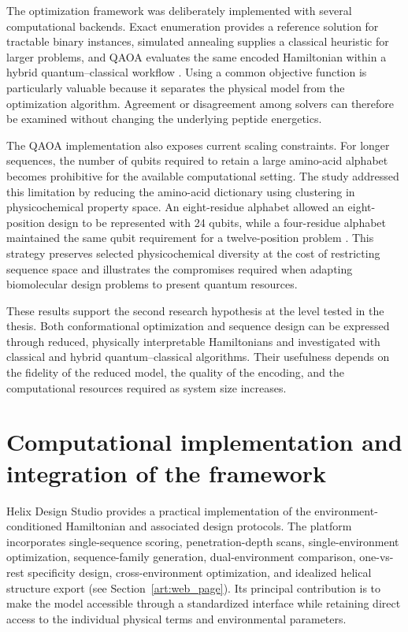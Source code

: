 The optimization framework was deliberately implemented with several computational backends. Exact enumeration provides a reference solution for tractable binary instances, simulated annealing supplies a classical heuristic for larger problems, and QAOA evaluates the same encoded Hamiltonian within a hybrid quantum--classical workflow \cite{DANI_HAMILTONIAN}. Using a common objective function is particularly valuable because it separates the physical model from the optimization algorithm. Agreement or disagreement among solvers can therefore be examined without changing the underlying peptide energetics.

The QAOA implementation also exposes current scaling constraints. For longer sequences, the number of qubits required to retain a large amino-acid alphabet becomes prohibitive for the available computational setting. The study addressed this limitation by reducing the amino-acid dictionary using clustering in physicochemical property space. An eight-residue alphabet allowed an eight-position design to be represented with 24 qubits, while a four-residue alphabet maintained the same qubit requirement for a twelve-position problem \cite{DANI_HAMILTONIAN}. This strategy preserves selected physicochemical diversity at the cost of restricting sequence space and illustrates the compromises required when adapting biomolecular design problems to present quantum resources.

These results support the second research hypothesis at the level tested in the thesis. Both conformational optimization and sequence design can be expressed through reduced, physically interpretable Hamiltonians and investigated with classical and hybrid quantum--classical algorithms. Their usefulness depends on the fidelity of the reduced model, the quality of the encoding, and the computational resources required as system size increases.





\section{Computational implementation and integration of the framework}


Helix Design Studio provides a practical implementation of the environment-conditioned Hamiltonian and associated design protocols. The platform incorporates single-sequence scoring, penetration-depth scans, single-environment optimization, sequence-family generation, dual-environment comparison, one-vs-rest specificity design, cross-environment optimization, and idealized helical structure export (see Section~\ref{art:web_page}). Its principal contribution is to make the model accessible through a standardized interface while retaining direct access to the individual physical terms and environmental parameters.

